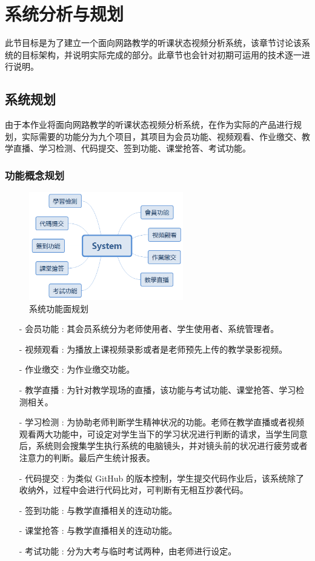 \chapter{系统分析与规划}
\label{chap:1}

此节目标是为了建立一个面向网路教学的听课状态视频分析系统，该章节讨论该系统的目标架构，并说明实际完成的部分。此章节也会针对初期可运用的技术逐一进行说明。

\section{系统规划}

由于本作业将面向网路教学的听课状态视频分析系统，在作为实际的产品进行规划，实际需要的功能分为九个项目，其项目为会员功能、视频观看、作业缴交、教学直播、学习检测、代码提交、签到功能、课堂抢答、考试功能。

\subsection{功能概念规划}

\begin{figure}[htb]
\centering 
\includegraphics[width=0.60\textwidth]{img/ch1m1.png} 
\caption{系统功能面规划}
\label{Test}
\end{figure}

\begin{itemize}
\item [-] 会员功能 : 其会员系统分为老师使用者、学生使用者、系统管理者。
\item [-] 视频观看 : 为播放上课视频录影或者是老师预先上传的教学录影视频。
\item [-] 作业缴交 : 为作业缴交功能。
\item [-] 教学直播 : 为针对教学现场的直播，该功能与考试功能、课堂抢答、学习检测相关。
\item [-] 学习检测 : 为协助老师判断学生精神状况的功能。老师在教学直播或者视频观看两大功能中，可设定对学生当下的学习状况进行判断的请求，当学生同意后，系统则会搜集学生执行系统的电脑镜头，并对镜头前的状况进行疲劳或者注意力的判断。最后产生统计报表。
\item [-] 代码提交 : 为类似 GitHub 的版本控制，学生提交代码作业后，该系统除了收纳外，过程中会进行代码比对，可判断有无相互抄袭代码。
\item [-] 签到功能 : 与教学直播相关的连动功能。
\item [-] 课堂抢答 : 与教学直播相关的连动功能。
\item [-] 考试功能 : 分为大考与临时考试两种，由老师进行设定。
\end{itemize}

